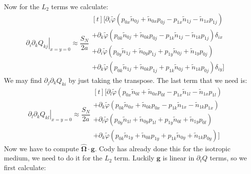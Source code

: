 \documentclass[reqno]{article}
\newcommand{\Omegahat}{\hat{\boldsymbol{\Omega}}}
\newcommand{\phitilde}{\tilde{\varphi}}
\begin{document}
Now for the $L_2$ terms we calculate:
\begin{equation}
    \left. \partial_i \partial_k Q_{k j} \right|_{x = y = 0}
    \approx
    \frac{S_N}{2 a}
    \begin{multlined}[t]
    \biggl[
         \partial_i \phitilde \left( p_{0x} \tilde{n}_{0j} + \tilde{n}_{0x} p_{0j} - p_{1x} \tilde{n}_{1j} - \tilde{n}_{1x} p_{1j} \right) \\
        + \partial_k \phitilde \left( 
            p_{0k} \tilde{n}_{0j} + \tilde{n}_{0k} p_{0j} - p_{1k} \tilde{n}_{1j} - \tilde{n}_{1k} p_{1j}
        \right) \delta_{ix} \\
        + \partial_i \phitilde \left( 
            p_{0y} \tilde{n}_{1j} + \tilde{n}_{0y} p_{1j} + p_{1y} \tilde{n}_{0j} + \tilde{n}_{1y} p_{0j}
        \right) \\
        + \partial_k \phitilde  \left( 
            p_{0k} \tilde{n}_{1j} + \tilde{n}_{0k} p_{1j} + p_{1k} \tilde{n}_{0j} + \tilde{n}_{1k} p_{0j}
        \right) \delta_{i y}
    \biggr]
    \end{multlined}
\end{equation}
We may find $\partial_j \partial_k Q_{ki}$ by just taking the transpose.
The last term that we need is:
\begin{equation}
    \left. \partial_l \partial_k Q_{k l} \right|_{x = y = 0}
    \approx
    \frac{S_N}{2 a}
    \begin{multlined}[t]
    \biggl[
         \partial_l \phitilde \left( p_{0x} \tilde{n}_{0l} + \tilde{n}_{0x} p_{0l} - p_{1x} \tilde{n}_{1l} - \tilde{n}_{1x} p_{1l} \right) \\
        + \partial_k \phitilde \left( 
            p_{0k} \tilde{n}_{0x} + \tilde{n}_{0k} p_{0x} - p_{1k} \tilde{n}_{1x} - \tilde{n}_{1k} p_{1x}
        \right) \\
        + \partial_l \phitilde \left( 
            p_{0y} \tilde{n}_{1l} + \tilde{n}_{0y} p_{1l} + p_{1y} \tilde{n}_{0l} + \tilde{n}_{1y} p_{0l}
        \right) \\
        + \partial_k \phitilde  \left( 
            p_{0k} \tilde{n}_{1y} + \tilde{n}_{0k} p_{1y} + p_{1k} \tilde{n}_{0y} + \tilde{n}_{1k} p_{0y}
        \right)
    \biggr]
    \end{multlined}
\end{equation}
Now we have to compute $\Omegahat \cdot \mathbf{g}$.
Cody has already done this for the isotropic medium, we need to do it for the $L_2$ term.
Luckily $\mathbf{g}$ is linear in $\partial_t Q$ terms, so we first calculate:
\end{document}
